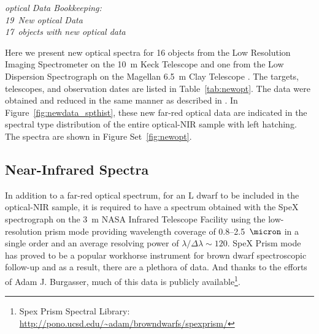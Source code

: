 \documentclass[12pt,preprint]{aastex}
\newcommand{\newoptSpectra}{19} %
\newcommand{\newoptObjects}{17} %
\begin{document}

\label{sec:obs_new_opt}

\emph{optical Data Bookkeeping: \\
\newoptSpectra~New optical Data\\
\newoptObjects~objects with new optical data\\}

Here we present new optical spectra for 16 objects from the Low Resolution Imaging Spectrometer on the 10~m Keck Telescope \citep[LRIS]{LRIS} and one from the Low Dispersion Spectrograph on the Magellan 6.5~m Clay Telescope \citep[LDSS-3]{LDSS2}.
The targets, telescopes, and observation dates are listed in Table~\ref{tab:newopt}. 
The data were obtained and reduced in the same manner as described in \citet{Kirkpatrick10}. 
In Figure~\ref{fig:newdata_spthist}, these new far-red optical data are indicated in the spectral type distribution of the entire optical-NIR sample with left hatching.
The spectra are shown in Figure Set~\ref{fig:newopt}.

\subsection{Near-Infrared Spectra}

In addition to a far-red optical spectrum, for an L dwarf to be included in the optical-NIR sample, it is required to have a spectrum obtained with the SpeX spectrograph \citep{Spex} on the 3~m NASA Infrared Telescope Facility using the low-resolution prism mode providing wavelength coverage of 0.8--2.5~$\micron$ in a single order and an average resolving power of $\lambda/\Delta\lambda\sim120$.
SpeX Prism mode has proved to be a popular workhorse instrument for brown dwarf spectroscopic follow-up and as a result, there are a plethora of data. And thanks to the efforts of Adam J. Burgasser, much of this data is publicly available\footnote{Spex Prism Spectral Library: \url{http://pono.ucsd.edu/~adam/browndwarfs/spexprism/}}. 
\end{document}
